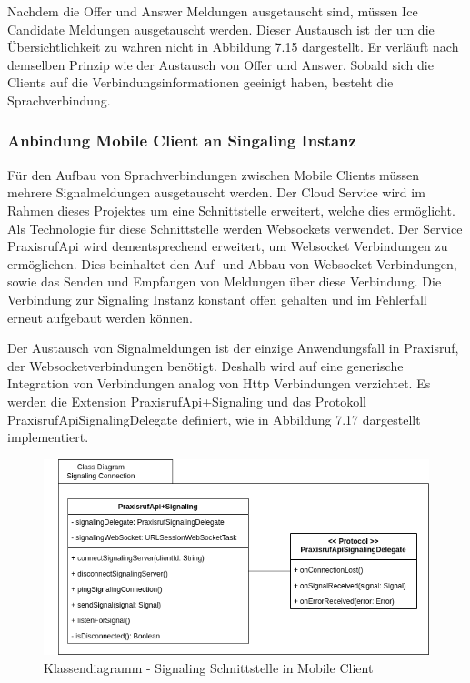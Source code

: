 Nachdem die Offer und Answer Meldungen ausgetauscht sind, müssen Ice Candidate Meldungen ausgetauscht werden.
Dieser Austausch ist der um die Übersichtlichkeit zu wahren nicht in Abbildung 7.15 dargestellt.
Er verläuft nach demselben Prinzip wie der Austausch von Offer und Answer.
Sobald sich die Clients auf die Verbindungsinformationen geeinigt haben, besteht die Sprachverbindung.

\clearpage

\subsubsection{Anbindung Mobile Client an Singaling Instanz}

Für den Aufbau von Sprachverbindungen zwischen Mobile Clients müssen mehrere Signalmeldungen ausgetauscht werden.
Der Cloud Service wird im Rahmen dieses Projektes um eine Schnittstelle erweitert, welche dies ermöglicht.
Als Technologie für diese Schnittstelle werden Websockets verwendet.
Der Service PraxisrufApi wird dementsprechend erweitert, um Websocket Verbindungen zu ermöglichen.
Dies beinhaltet den Auf- und Abbau von Websocket Verbindungen, sowie das Senden und Empfangen von Meldungen über diese Verbindung.
Die Verbindung zur Signaling Instanz konstant offen gehalten und im Fehlerfall erneut aufgebaut werden können.

Der Austausch von Signalmeldungen ist der einzige Anwendungsfall in Praxisruf, der Websocketverbindungen benötigt.
Deshalb wird auf eine generische Integration von Verbindungen analog von Http Verbindungen verzichtet.
Es werden die Extension PraxisrufApi+Signaling und das Protokoll PraxisrufApiSignalingDelegate definiert, wie in Abbildung 7.17 dargestellt implementiert.

\begin{figure}[h]
    \centering
    \begin{minipage}[b]{0.9\textwidth}
        \includegraphics[width=\textwidth]{graphics/diagramms/Class_Mobile_Client_Signaling_Connection}
        \caption{Klassendiagramm - Signaling Schnittstelle in Mobile Client}
    \end{minipage}
\end{figure}


